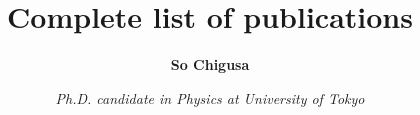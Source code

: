 \documentclass[12pt,notitlepage]{article}
\title{\vspace*{-3cm}Complete list of publications}
\author{\textbf{So Chigusa}}
\date{\vspace*{-4mm}\textit{Ph.D. candidate in Physics at University of Tokyo}}
\begin{document}
\maketitle

\nocite{*}


\end{document}
